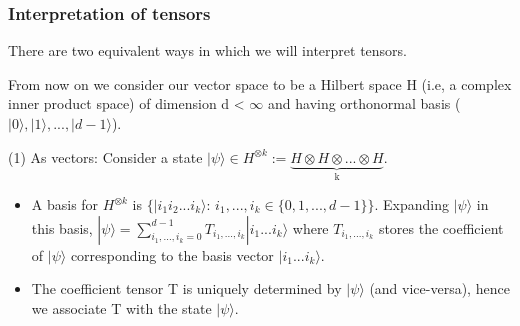 \documentclass[11pt]{beamer}
\newcommand{\vs}{\vskip10pt}
\begin{document}
\begin{frame}
	
	\frametitle{Interpretation of tensors}
	
	There are two equivalent ways in which we will interpret tensors. 
	
	From now on we consider our vector space to be a Hilbert space H (i.e, a complex inner product space) of dimension d < $ \infty $ and having orthonormal basis ($ |0 \rangle, |1 \rangle, ..., |d-1 \rangle$). 
	\vs
	
	(1) As vectors: Consider a state $ |\psi \rangle \in H^{\otimes k} := \underbrace {H \otimes H \otimes ... \otimes H}_{\text{k}} $. 
	
	\begin{itemize} 
	
	\item A basis for $ H^{\otimes k} $ is $ \{|i_1 i_2 ... i_k \rangle $: $i_1,...,i_k \in  \{0,1,...,d-1\}\}$. Expanding $ |\psi \rangle $ in this basis, 
	\vs
	$ |\psi \rangle = \sum_{i_1,...,i_k = 0}^{d-1} T_{i_1,...,i_k} |i_1...i_k \rangle $
	\vs
	where $T_{i_1,...,i_k}$ stores the coefficient of $ |\psi \rangle $ corresponding to the basis vector $ |i_1...i_k \rangle $. 
	
	\item The coefficient tensor T is uniquely determined by $ |\psi \rangle $ (and vice-versa), hence we associate T with the state $ |\psi \rangle $. 
	
	
	
	\end{itemize}
	
	
\end{frame}
\end{document}
